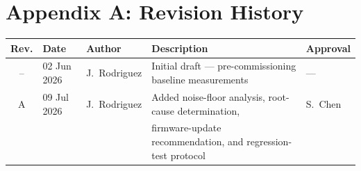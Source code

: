 \section*{Appendix A: Revision History}

\vspace{4pt}

\begin{center}
\begin{tabular}{@{}cllp{58mm}l@{}}
\toprule
\textbf{Rev.} & \textbf{Date}       & \textbf{Author}      & \textbf{Description}                                                & \textbf{Approval} \\
\midrule
--            & 02 Jun 2026         & J.\ Rodriguez        & Initial draft --- pre-commissioning baseline measurements           & --- \\
A             & 09 Jul 2026         & J.\ Rodriguez        & Added noise-floor analysis, root-cause determination,               & S.\ Chen \\
              &                     &                      & firmware-update recommendation, and regression-test protocol        & \\
\bottomrule
\end{tabular}
\end{center}

